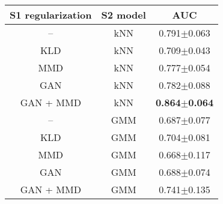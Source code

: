 \begin{tabular}{c c c}
	S1 regularization & S2 model & AUC  \\
	\hline
	-- & kNN & 0.791$\pm$0.063 \\
	KLD & kNN & 0.709$\pm$0.043 \\
	MMD & kNN & 0.777$\pm$0.054 \\
GAN & kNN & 0.782$\pm$0.088 \\
GAN + MMD & kNN & \textbf{0.864}$\pm$\textbf{0.064} \\
-- & GMM & 0.687$\pm$0.077 \\
	KLD & GMM & 0.704$\pm$0.081 \\
	MMD & GMM & 0.668$\pm$0.117 \\
GAN & GMM & 0.688$\pm$0.074 \\
GAN + MMD & GMM & 0.741$\pm$0.135 
\end{tabular}